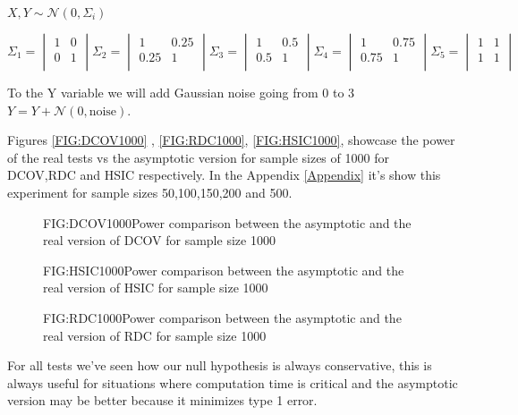 $ X,Y \sim \mathcal{N}(0,\Sigma_{i}) $


$$\Sigma_{1} =\begin{vmatrix}1&0\\0&1\\ \end{vmatrix} \Sigma_{2} =\begin{vmatrix}1&0.25\\0.25&1\\ \end{vmatrix} \Sigma_{3} =\begin{vmatrix}1&0.5\\0.5&1\\ \end{vmatrix} \Sigma_{4} =\begin{vmatrix}1&0.75\\0.75&1\\ \end{vmatrix} \Sigma_{5} =\begin{vmatrix}1&1\\1&1\\ \end{vmatrix} $$

To the Y variable we will add  Gaussian noise going from 0 to 3
$ Y = Y + \mathcal{N}(0,\text{noise}) $.

Figures \ref{FIG:DCOV1000} , \ref{FIG:RDC1000}, \ref{FIG:HSIC1000}, showcase the power of the real tests vs the asymptotic version for sample sizes of 1000  for DCOV,RDC and HSIC respectively. In the Appendix \ref{Appendix} it's show this experiment for sample sizes 50,100,150,200 and 500.
\FloatBarrier
\begin{figure}[DCOV asymptotic size 1000]{FIG:DCOV1000}{Power comparison between the asymptotic and the real version of DCOV for sample size 1000}
\end{figure}
\begin{figure}[HSIC asymptotic size 1000]{FIG:HSIC1000}{Power comparison between the asymptotic and the real version of HSIC for sample size 1000}
\end{figure}
\begin{figure}[RDC asymptotic size 1000]{FIG:RDC1000}{Power comparison between the asymptotic and the real version of RDC for sample size 1000}
\end{figure}
\FloatBarrier
For all tests we've seen how our null hypothesis is always conservative, this is always useful for situations where computation time is critical and the asymptotic version may be better because it minimizes type 1 error.

